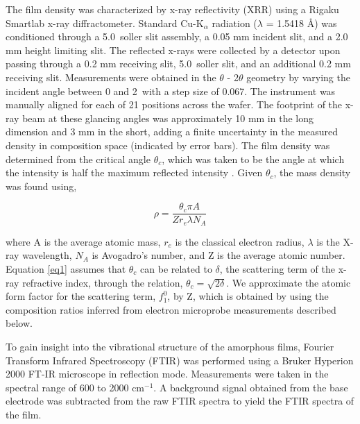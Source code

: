 \documentclass[aip,jap,numerical,citeautoscript,preprint]{revtex4-1}
\begin{document}
The film density was characterized by x-ray reflectivity (XRR) using a Rigaku Smartlab x-ray diffractometer. Standard Cu-K$_{\alpha}$ radiation ($\lambda$ = 1.5418 \AA) was conditioned through a 5.0\textdegree \ soller slit assembly, a 0.05 mm incident slit, and a 2.0 mm height limiting slit. The reflected x-rays were collected by a detector upon passing through a 0.2 mm receiving slit, 5.0\textdegree \ soller slit, and an additional 0.2 mm receiving slit. Measurements were obtained in the $\theta$ - 2$\theta$ geometry by varying the incident angle between 0 and 2\textdegree \ with a step size of 0.067\textdegree. The instrument was manually aligned for each of 21 positions across the wafer. The footprint of the x-ray beam at these glancing angles was approximately 10 mm in the long dimension and 3 mm in the short, adding a finite uncertainty in the measured density in composition space (indicated by error bars). The film density was determined from the critical angle $\theta_{c}$, which was taken to be the angle at which the intensity is half the maximum reflected intensity \cite{Parratt1954}. Given $\theta_{c}$, the mass density was found using,

\begin{equation}
\rho = \frac{\theta_{c}\pi A}{Z r_{e} \lambda N_{A}}
\label{eq1}
\end{equation}

where A is the average atomic mass, $r_{e}$ is the classical electron radius, $\lambda$ is the X-ray wavelength, $N_{A}$ is Avogadro’s number, and Z is the average atomic number.\cite{Bahr1993} Equation \ref{eq1} assumes that $\theta_{c}$ can be related to $\delta$, the scattering term of the x-ray refractive index, through the relation, $\theta_{c} = \sqrt{2\delta}$. We approximate the atomic form factor for the scattering term, $f^{0}_{1}$, by Z, which is obtained by using the composition ratios inferred from electron microprobe measurements described below. 

To gain insight into the vibrational structure of the amorphous films, Fourier Transform Infrared Spectroscopy (FTIR) was performed using a Bruker Hyperion 2000 FT-IR microscope in reflection mode. Measurements were taken in the spectral range of 600 to 2000 cm$^{-1}$. A background signal obtained from the base electrode was subtracted from the raw FTIR spectra to yield the FTIR spectra of the film.  
\end{document}
